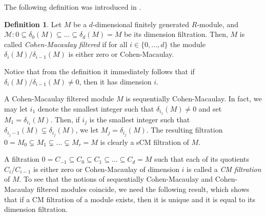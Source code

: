 \documentclass[12pt]{amsart}
\theoremstyle{definition}
\theoremstyle{definition}
\newtheorem{definition}[theorem]{Definition}
\begin{document}
The following definition was introduced in \cite[Definition 4.1]{Sch99}.
  \begin{definition}
  Let $M$ be a $d$-dimensional finitely generated $R$-module, and $\mathcal{M}:0 \subseteq \delta_0(M) \subseteq \ldots \subseteq \delta_d(M) =M$ be its dimension filtration. Then, $M$ is called {\em Cohen-Macaulay filtered} if for all $i \in \{0,\ldots,d\}$ the module $\delta_i(M)/\delta_{i-1}(M)$ is either zero or Cohen-Macaulay.   
 \end{definition}

  \noindent
  Notice that from the definition it immediately follows that if $\delta_i(M)/\delta_{i-1}(M)\neq 0$, then it has dimension $i$.
  
 A Cohen-Macaulay filtered module $M$ is sequentially Cohen-Macaulay. In fact, we may let $i_1$ denote  the smallest integer such that $\delta_{i_1}(M) \ne 0$ and set $M_1=\delta_{i_1}(M)$. Then, if $i_j$ is the smallest integer such that $\delta_{i_j-1}(M)\subsetneq \delta_{i_j}(M)$, we let $M_j=\delta_{i_j}(M)$. The resulting filtration $0 =M_0 \subsetneq M_1 \subsetneq \ldots \subsetneq M_r =M$ is clearly a sCM filtration of $M$.

  
A filtration $0=C_{-1}\subseteq C_0\subseteq C_1\subseteq \ldots \subseteq C_d=M$ such that each of its quotients $C_i/C_{i-1}$ is either zero or Cohen-Macaulay of dimension $i$ is called a {\em CM filtration} of $M$.  To see that the notions of sequentially Cohen-Macaulay and Cohen-Macaulay filtered modules coincide, we need the following result, which shows that if a CM filtration of a module exists, then it is unique and it is equal to its dimension filtration. 
\end{document}
